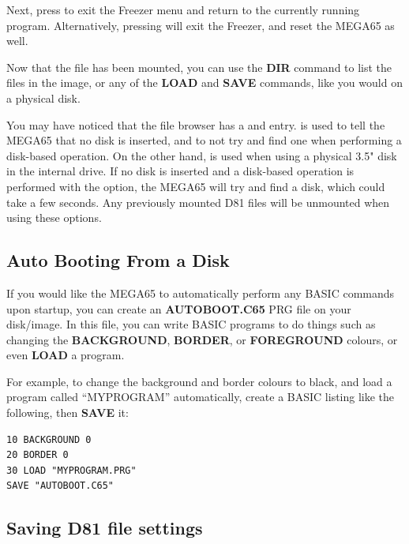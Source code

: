 Next, press  to exit the Freezer menu and return to the currently running program. Alternatively,
pressing  will exit the Freezer, and reset the MEGA65 as well.

Now that the file has been mounted, you can use
the {\bf DIR} command to list the files in the image, or any of the {\bf LOAD} and {\bf SAVE} commands, like you
would on a physical disk.

You may have noticed that the file browser has a  and 
entry.  is used to tell
the MEGA65 that no disk is inserted, and to not try and find one when performing a disk-based operation. On the other
hand,  is used when using a physical 3.5" disk in the internal drive. If no disk is
inserted and a disk-based operation is performed with the  option, the MEGA65 will
try and find a disk, which could take a few seconds. Any previously mounted D81 files will be unmounted when using
these options.


\subsection{Auto Booting From a Disk}
If you would like the MEGA65 to automatically perform any BASIC commands upon startup, you can create an
{\bf AUTOBOOT.C65} PRG file on your disk/image. In this file, you can write BASIC programs to do things such
as changing the {\bf BACKGROUND}, {\bf BORDER}, or {\bf FOREGROUND} colours, or even {\bf LOAD} a program.

For example, to change the background and border colours to black, and load a program called ``MYPROGRAM''
automatically, create a BASIC listing like the following, then {\bf SAVE} it:

\begin{tcolorbox}[colback=black,coltext=white]
\verbatimfont{\codefont}
\begin{verbatim}
10 BACKGROUND 0
20 BORDER 0
30 LOAD "MYPROGRAM.PRG"
SAVE "AUTOBOOT.C65"
\end{verbatim}
\end{tcolorbox}

\subsection{Saving D81 file settings}

